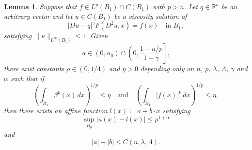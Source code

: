 \documentclass[11pt]{amsart}
\theoremstyle{plain}
\newtheorem{lemma}[theorem]{Lemma}
\theoremstyle{definition}
\numberwithin{equation}{section}
\begin{document}
\begin{lemma} \label{Capprolem}
    Suppose that $f \in L^p(B_1) \cap C(B_1)$ with $p>n$. 
    Let $q \in \mathbb{R}^n$ be an arbitrary vector and let $u \in C(B_1)$ be a viscosity solution of 
    \begin{equation*}
        |Du-q|^{\gamma}F(D^2u, x)=f(x)  \quad \text{in $B_1$},
    \end{equation*}
    satisfying $\|u\|_{L^{\infty}(B_1)} \leq 1$. Given 
    \begin{equation*}
        \alpha \in (0, \alpha_0) \cap \left(0, \frac{1-n/p}{1+\gamma}\right],
    \end{equation*}
    there exist constants $\rho \in (0, 1/4)$ and $\eta>0$ depending only on $n$, $p$, $\lambda$, $\Lambda$, $\gamma$ and $\alpha$ such that if
    \begin{equation*}
        \left(\int_{B_1}\beta^p(x) \, dx\right)^{1/p}\leq \eta \quad \text{and} \quad \left(\int_{B_1}|f(x)|^p \,dx\right)^{1/p} \leq \eta,
    \end{equation*}
    then there exists an affine function $l(x) \coloneqq a+{b} \cdot x$ satisfying
    \begin{equation*}
        \sup_{B_{\rho}}|u(x)-l(x)| \leq \rho^{1+\alpha}
    \end{equation*}
    and
    \begin{equation*}
        |a|+|{b}| \leq C(n, \lambda, \Lambda).
    \end{equation*}
\end{lemma}
\end{document}
